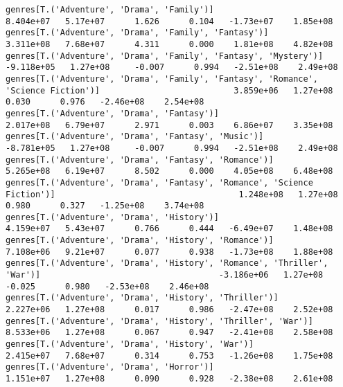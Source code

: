 \documentclass[11pt]{article}
\begin{document}
\begin{Verbatim}[commandchars=\\\{\}]
genres[T.('Adventure', 'Drama', 'Family')]                                                                    8.404e+07   5.17e+07      1.626      0.104   -1.73e+07    1.85e+08
genres[T.('Adventure', 'Drama', 'Family', 'Fantasy')]                                                         3.311e+08   7.68e+07      4.311      0.000    1.81e+08    4.82e+08
genres[T.('Adventure', 'Drama', 'Family', 'Fantasy', 'Mystery')]                                             -9.118e+05   1.27e+08     -0.007      0.994   -2.51e+08    2.49e+08
genres[T.('Adventure', 'Drama', 'Family', 'Fantasy', 'Romance', 'Science Fiction')]                           3.859e+06   1.27e+08      0.030      0.976   -2.46e+08    2.54e+08
genres[T.('Adventure', 'Drama', 'Fantasy')]                                                                   2.017e+08   6.79e+07      2.971      0.003    6.86e+07    3.35e+08
genres[T.('Adventure', 'Drama', 'Fantasy', 'Music')]                                                         -8.781e+05   1.27e+08     -0.007      0.994   -2.51e+08    2.49e+08
genres[T.('Adventure', 'Drama', 'Fantasy', 'Romance')]                                                        5.265e+08   6.19e+07      8.502      0.000    4.05e+08    6.48e+08
genres[T.('Adventure', 'Drama', 'Fantasy', 'Romance', 'Science Fiction')]                                     1.248e+08   1.27e+08      0.980      0.327   -1.25e+08    3.74e+08
genres[T.('Adventure', 'Drama', 'History')]                                                                   4.159e+07   5.43e+07      0.766      0.444   -6.49e+07    1.48e+08
genres[T.('Adventure', 'Drama', 'History', 'Romance')]                                                        7.108e+06   9.21e+07      0.077      0.938   -1.73e+08    1.88e+08
genres[T.('Adventure', 'Drama', 'History', 'Romance', 'Thriller', 'War')]                                    -3.186e+06   1.27e+08     -0.025      0.980   -2.53e+08    2.46e+08
genres[T.('Adventure', 'Drama', 'History', 'Thriller')]                                                       2.227e+06   1.27e+08      0.017      0.986   -2.47e+08    2.52e+08
genres[T.('Adventure', 'Drama', 'History', 'Thriller', 'War')]                                                8.533e+06   1.27e+08      0.067      0.947   -2.41e+08    2.58e+08
genres[T.('Adventure', 'Drama', 'History', 'War')]                                                            2.415e+07   7.68e+07      0.314      0.753   -1.26e+08    1.75e+08
genres[T.('Adventure', 'Drama', 'Horror')]                                                                    1.151e+07   1.27e+08      0.090      0.928   -2.38e+08    2.61e+08

\end{Verbatim}
\end{document}
